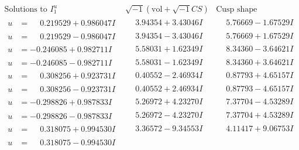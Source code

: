 \documentclass[1p]{elsarticle_modified}
\theoremstyle{definition}
\newcommand{\I}{\sqrt{-1}}
\begin{document}
$$\begin{array}{c|c|c}  
\text{Solutions to }I^u_{1}& \I (\text{vol} + \sqrt{-1}CS) & \text{Cusp shape}\\
 \hline 
\begin{aligned}
u &= \phantom{-}0.219529 + 0.986047 I\end{aligned}
 & \phantom{-}3.94354 + 3.43046 I & \phantom{-}5.76669 - 1.67529 I \\ \hline\begin{aligned}
u &= \phantom{-}0.219529 - 0.986047 I\end{aligned}
 & \phantom{-}3.94354 - 3.43046 I & \phantom{-}5.76669 + 1.67529 I \\ \hline\begin{aligned}
u &= -0.246085 + 0.982711 I\end{aligned}
 & \phantom{-}5.58031 + 1.62349 I & \phantom{-}8.34360 - 3.64621 I \\ \hline\begin{aligned}
u &= -0.246085 - 0.982711 I\end{aligned}
 & \phantom{-}5.58031 - 1.62349 I & \phantom{-}8.34360 + 3.64621 I \\ \hline\begin{aligned}
u &= \phantom{-}0.308256 + 0.923731 I\end{aligned}
 & \phantom{-}0.40552 - 2.46934 I & \phantom{-}0.87793 + 4.65157 I \\ \hline\begin{aligned}
u &= \phantom{-}0.308256 - 0.923731 I\end{aligned}
 & \phantom{-}0.40552 + 2.46934 I & \phantom{-}0.87793 - 4.65157 I \\ \hline\begin{aligned}
u &= -0.298826 + 0.987833 I\end{aligned}
 & \phantom{-}5.26972 + 4.23270 I & \phantom{-}7.37704 - 4.53289 I \\ \hline\begin{aligned}
u &= -0.298826 - 0.987833 I\end{aligned}
 & \phantom{-}5.26972 - 4.23270 I & \phantom{-}7.37704 + 4.53289 I \\ \hline\begin{aligned}
u &= \phantom{-}0.318075 + 0.994530 I\end{aligned}
 & \phantom{-}3.36572 - 9.34553 I & \phantom{-}4.11417 + 9.06753 I \\ \hline\begin{aligned}
u &= \phantom{-}0.318075 - 0.994530 I\end{aligned}

\end{array}$$
\end{document}

